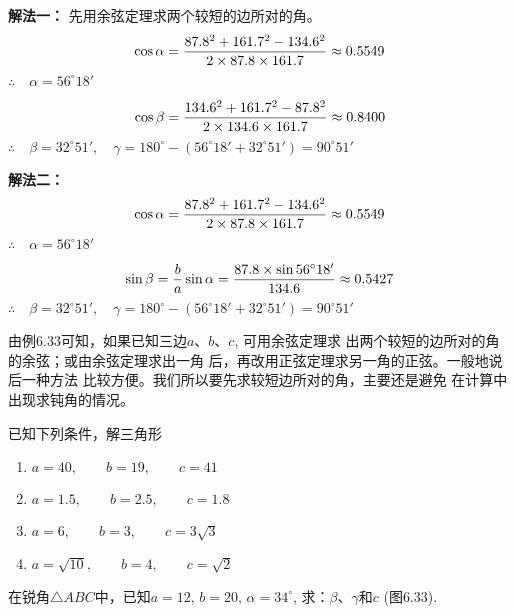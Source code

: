 \begin{solution}
\textbf{解法一：} 先用余弦定理求两个较短的边所对的角。
\[\cos\alpha=\dfrac{87.8^2+161.7^2-134.6^2}{2\times 87.8\times 161.7}\approx 0.5549\]
$\therefore\quad \alpha=56^{\circ}18'$

\[\cos\beta=\dfrac{134.6^2+161.7^2-87.8^2}{2\times134.6\times161.7}\approx 0.8400\]
$\therefore\quad \beta=32^{\circ}51',\quad 
\gamma=180^{\circ}-(56^{\circ}18'+32^{\circ}51')=90^{\circ}51'$

\textbf{解法二：} 
\[\cos\alpha=\dfrac{87.8^2+161.7^2-134.6^2}{2\times 87.8\times 161.7}\approx 0.5549\]
$\therefore\quad \alpha=56^{\circ}18'$
    
\[\sin\beta=\dfrac{b}{a}\sin\alpha=\dfrac{87.8\times \sin 56^{\circ}18'}{134.6}\approx 0.5427\]
$\therefore\quad \beta=32^{\circ}51', \quad \gamma=180^{\circ}-(56^{\circ}18'+32^{\circ}51')=90^{\circ}51'$
\end{solution}

由例6.33可知，如果已知三边$a$、$b$、$c$, 可用余弦定理求
出两个较短的边所对的角的余弦；或由余弦定理求出一角
后，再改用正弦定理求另一角的正弦。一般地说后一种方法
比较方便。我们所以要先求较短边所对的角，主要还是避免
在计算中出现求钝角的情况。

\begin{ex}
    已知下列条件，解三角形
\begin{enumerate}
\item $a=40,\qquad b=19,\qquad c=41$
\item $a=1.5,\qquad b=2.5,\qquad c=1.8$
\item $a=6,\qquad b=3,\qquad c=3\sqrt{3}$
\item $a=\sqrt{10},\qquad b=4,\qquad c=\sqrt{2}$   
\end{enumerate}
\end{ex}

\begin{example}
    在锐角$\triangle ABC$中，已知$a=12$, $b=20$, $\alpha=34^{\circ}$, 
    求：$\beta$、$\gamma$和$c$ (图6.33).
\end{example}

\begin{figure}[htp]
    \centering
{}
    \caption{}
\end{figure}


